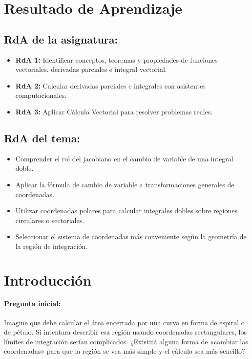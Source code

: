 \documentclass[a4,11pt]{aleph-notas}
\begin{document}
\encabezado

\section*{Resultado de Aprendizaje}

\subsection*{RdA de la asignatura:}
\begin{itemize}[leftmargin=*]
    \item \textbf{RdA 1:} Identificar conceptos, teoremas y propiedades de funciones vectoriales, derivadas parciales e integral vectorial.
    \item \textbf{RdA 2:} Calcular derivadas parciales e integrales con asistentes computacionales.
    \item \textbf{RdA 3:} Aplicar Cálculo Vectorial para resolver problemas reales.
\end{itemize}

\subsection*{RdA del tema:}
\begin{itemize}[leftmargin=*]
    \item Comprender el rol del jacobiano en el cambio de variable de una integral doble.
    \item Aplicar la fórmula de cambio de variable a transformaciones generales de coordenadas.
    \item Utilizar coordenadas polares para calcular integrales dobles sobre regiones circulares o sectoriales.
    \item Seleccionar el sistema de coordenadas más conveniente según la geometría de la región de integración.
\end{itemize}

\section*{Introducción}

\paragraph{Pregunta inicial:}
Imagine que debe calcular el área encerrada por una curva en forma de espiral o de pétalo. Si intentara describir esa región usando coordenadas rectangulares, los límites de integración serían complicados. ¿Existirá alguna forma de «cambiar las coordenadas» para que la región se vea más simple y el cálculo sea más sencillo?
\end{document}
